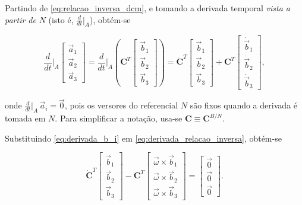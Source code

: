 Partindo de \eqref{eq:relacao_inversa_dcm}, e tomando a derivada temporal \emph{vista a partir de} $N$ (isto é, $\frac{d}{dt}\big|_A$), obtém-se

\begin{equation}
\frac{d}{dt}\bigg|_A
\begin{bmatrix}
\vec{a}_1 \\
\vec{a}_2 \\
\vec{a}_3
\end{bmatrix}
=
\frac{d}{dt}\bigg|_A
\left(
\mathbf{C}^{T}
\begin{bmatrix}
\vec{b}_1 \\
\vec{b}_2 \\
\vec{b}_3
\end{bmatrix}
\right)
=
\dot{\mathbf{C}}^{T}
\begin{bmatrix}
\vec{b}_1 \\
\vec{b}_2 \\
\vec{b}_3
\end{bmatrix}
+
\mathbf{C}^{T}
\begin{bmatrix}
\dot{\vec{b}}_1 \\
\dot{\vec{b}}_2 \\
\dot{\vec{b}}_3
\end{bmatrix},
\label{eq:derivada_relacao_inversa}
\end{equation}

onde $\frac{d}{dt}\big|_A\,\vec{a}_i=\vec{0}$, pois os versores do referencial $N$ são fixos quando a derivada é tomada em $N$.
Para simplificar a notação, usa-se $\mathbf{C}\equiv\mathbf{C}^{B/N}$.

Substituindo \eqref{eq:derivada_b_i} em \eqref{eq:derivada_relacao_inversa}, obtém-se

\begin{equation}
\dot{\mathbf{C}}^{T}
\begin{bmatrix}
\vec{b}_1 \\
\vec{b}_2 \\
\vec{b}_3
\end{bmatrix}
-
\mathbf{C}^{T}
\begin{bmatrix}
\vec{\omega}\times\vec{b}_1 \\
\vec{\omega}\times\vec{b}_2 \\
\vec{\omega}\times\vec{b}_3
\end{bmatrix}
=
\begin{bmatrix}
\vec{0} \\
\vec{0} \\
\vec{0}
\end{bmatrix}.
\end{equation}

